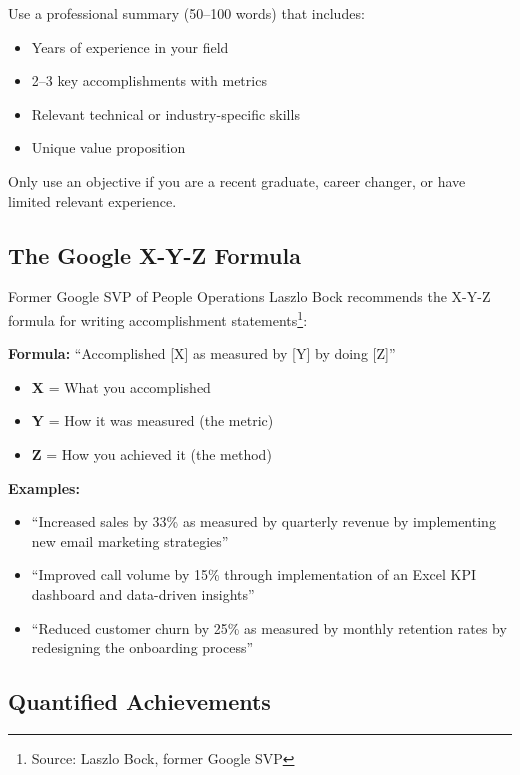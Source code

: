 \documentclass[11pt,a4paper]{article}
\begin{document}
\begin{bestpractice}
Use a professional summary (50--100 words) that includes:
\begin{itemize}[noitemsep]
    \item Years of experience in your field
    \item 2--3 key accomplishments with metrics
    \item Relevant technical or industry-specific skills
    \item Unique value proposition
\end{itemize}
Only use an objective if you are a recent graduate, career changer, or have limited relevant experience.
\end{bestpractice}

\subsection{The Google X-Y-Z Formula}

Former Google SVP of People Operations Laszlo Bock recommends the X-Y-Z formula for writing accomplishment statements\footnote{Source: Laszlo Bock, former Google SVP}:

\begin{tcolorbox}[colback=blue!5!white,colframe=blue!75!black]
\textbf{Formula:} ``Accomplished [X] as measured by [Y] by doing [Z]''
\begin{itemize}[noitemsep]
    \item \textbf{X} = What you accomplished
    \item \textbf{Y} = How it was measured (the metric)
    \item \textbf{Z} = How you achieved it (the method)
\end{itemize}
\end{tcolorbox}

\textbf{Examples:}
\begin{itemize}
    \item ``Increased sales by 33\% as measured by quarterly revenue by implementing new email marketing strategies''
    \item ``Improved call volume by 15\% through implementation of an Excel KPI dashboard and data-driven insights''
    \item ``Reduced customer churn by 25\% as measured by monthly retention rates by redesigning the onboarding process''
\end{itemize}

\subsection{Quantified Achievements}
\end{document}
